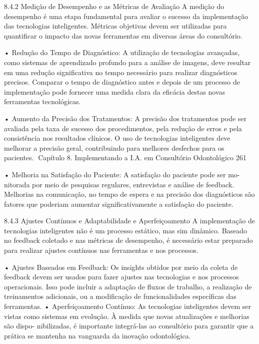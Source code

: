 8.4.2    Medição de Desempenho e as Métricas de Avaliação
A medição do desempenho é uma etapa fundamental para avaliar o sucesso da
implementação das tecnologias inteligentes. Métricas objetivas devem ser utilizadas
para quantificar o impacto das novas ferramentas em diversas áreas do consultório.

    • Redução do Tempo de Diagnóstico: A utilização de tecnologias avançadas,
      como sistemas de aprendizado profundo para a análise de imagens, deve resultar
      em uma redução significativa no tempo necessário para realizar diagnósticos
      precisos. Comparar o tempo de diagnóstico antes e depois de um processo
      de implementação pode fornecer uma medida clara da eficácia destas novas
      ferramentas tecnológicas.

    • Aumento da Precisão dos Tratamentos: A precisão dos tratamentos pode
      ser avaliada pela taxa de sucesso dos procedimentos, pela redução de erros
      e pela consistência nos resultados clínicos. O uso de tecnologias inteligentes
      deve melhorar a precisão geral, contribuindo para melhores desfechos para os
      pacientes.
Capítulo 8. Implementando a I.A. em Consultório Odontológico                         261


    • Melhoria na Satisfação do Paciente: A satisfação do paciente pode ser mo-
      nitorada por meio de pesquisas regulares, entrevistas e análise de feedback.
      Melhorias na comunicação, no tempo de espera e na precisão dos diagnósticos
      são fatores que poderiam aumentar significativamente a satisfação do paciente.

8.4.3    Ajustes Contínuos e Adaptabilidade e Aperfeiçoamento
A implementação de tecnologias inteligentes não é um processo estático, mas sim
dinâmico. Baseado no feedback coletado e nas métricas de desempenho, é necessário
estar preparado para realizar ajustes contínuos nas ferramentas e nos processos.

    • Ajustes Baseados em Feedback: Os insights obtidos por meio da coleta de
      feedback devem ser usados para fazer ajustes nas tecnologias e nos processos
      operacionais. Isso pode incluir a adaptação de fluxos de trabalho, a realização
      de treinamentos adicionais, ou a modificação de funcionalidades específicas das
      ferramentas.
    • Aperfeiçoamento Contínuo: As tecnologias inteligentes devem ser vistas como
      sistemas em evolução. À medida que novas atualizações e melhorias são dispo-
      nibilizadas, é importante integrá-las ao consultório para garantir que a prática se
      mantenha na vanguarda da inovação odontológica.

